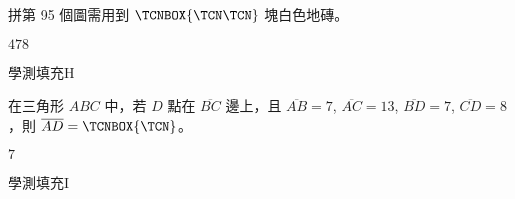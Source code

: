 \begin{QUESTIONS}
\begin{QUESTION}
\begin{QBODY}
		拼第 95 個圖需用到 $\TCNBOX{\TCN\TCN}$ 塊白色地磚。
        \end{QBODY}
        \begin{QFROMS}
        \end{QFROMS}
        \begin{QTAGS}\end{QTAGS}
        \begin{QANS}
            $478$
        \end{QANS}
        \begin{QSOLLIST}
        \end{QSOLLIST}
        \begin{QEMPTYSPACE}
        \end{QEMPTYSPACE}
    \end{QUESTION}
    \begin{QUESTION}
        \begin{ExamInfo}{95}{學測}{填充}{H}
        \end{ExamInfo}
        \begin{ExamAnsRateInfo}{51}{84}{47}{22}
        \end{ExamAnsRateInfo}
        \begin{QBODY}
            在三角形 $ABC$ 中，若 $D$ 點在 $\overline{BC}$ 邊上，且 $\overline{AB}=7$, $\overline{AC}=13$, $\overline{BD}=7$, $\overline{CD}=8$，則 $\overline{AD}=\TCNBOX{\TCN}$。
        \end{QBODY}
        \begin{QFROMS}
        \end{QFROMS}
        \begin{QTAGS}\end{QTAGS}
        \begin{QANS}
            $7$
        \end{QANS}
        \begin{QSOLLIST}
        \end{QSOLLIST}
        \begin{QEMPTYSPACE}
        \end{QEMPTYSPACE}
    \end{QUESTION}
    \begin{QUESTION}
        \begin{ExamInfo}{95}{學測}{填充}{I}
        \end{ExamInfo}
        \begin{ExamAnsRateInfo}{25}{56}{12}{7}
        \end{ExamAnsRateInfo}

\end{QUESTION}
\end{QUESTIONS}
